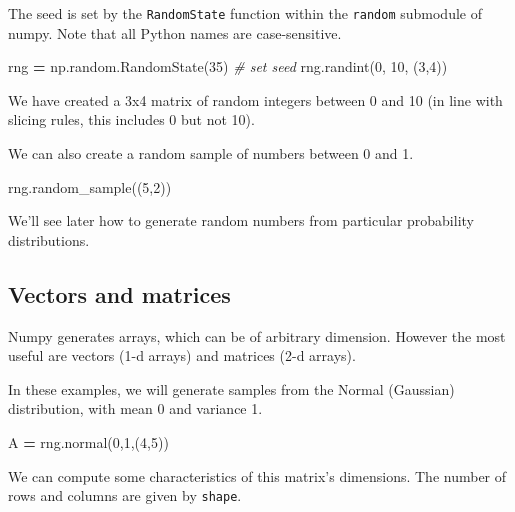 \documentclass[
  letterpaper,
]{scrbook}
\newenvironment{Shaded}{\begin{snugshade}}{\end{snugshade}}
\newcommand{\CommentTok}[1]{\textcolor[rgb]{0.56,0.35,0.01}{\textit{#1}}}
\newcommand{\DecValTok}[1]{\textcolor[rgb]{0.00,0.00,0.81}{#1}}
\newcommand{\NormalTok}[1]{#1}
\newcommand{\OperatorTok}[1]{\textcolor[rgb]{0.81,0.36,0.00}{\textbf{#1}}}
\begin{document}
The seed is set by the \texttt{RandomState} function within the \texttt{random} submodule of numpy. Note that all Python names are case-sensitive.

\begin{Shaded}
\begin{Highlighting}[]
\NormalTok{rng }\OperatorTok{=}\NormalTok{ np.random.RandomState(}\DecValTok{35}\NormalTok{) }\CommentTok{\# set seed}
\NormalTok{rng.randint(}\DecValTok{0}\NormalTok{, }\DecValTok{10}\NormalTok{, (}\DecValTok{3}\NormalTok{,}\DecValTok{4}\NormalTok{))}
\end{Highlighting}
\end{Shaded}

We have created a 3x4 matrix of random integers between 0 and 10 (in line with slicing rules, this includes 0 but not 10).

We can also create a random sample of numbers between 0 and 1.

\begin{Shaded}
\begin{Highlighting}[]
\NormalTok{rng.random\_sample((}\DecValTok{5}\NormalTok{,}\DecValTok{2}\NormalTok{))}
\end{Highlighting}
\end{Shaded}

We'll see later how to generate random numbers from particular probability distributions.

\hypertarget{vectors-and-matrices}{%
\subsection{Vectors and matrices}\label{vectors-and-matrices}}

Numpy generates arrays, which can be of arbitrary dimension. However the most useful are vectors (1-d arrays) and matrices (2-d arrays).

In these examples, we will generate samples from the Normal (Gaussian) distribution, with mean 0 and variance 1.

\begin{Shaded}
\begin{Highlighting}[]
\NormalTok{A }\OperatorTok{=}\NormalTok{ rng.normal(}\DecValTok{0}\NormalTok{,}\DecValTok{1}\NormalTok{,(}\DecValTok{4}\NormalTok{,}\DecValTok{5}\NormalTok{))}
\end{Highlighting}
\end{Shaded}

We can compute some characteristics of this matrix's dimensions. The number of rows and columns are given by \texttt{shape}.
\end{document}
